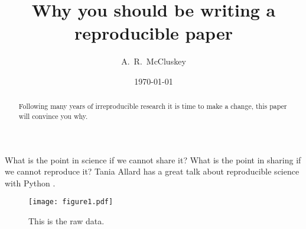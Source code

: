 \documentclass[amsmath,amssymb,twocolumn,superscriptaddress,aps,prl]{revtex4-1}
\begin{document}
\title{Why you should be writing a reproducible paper}

\author{A.~R.~McCluskey}

\date{\today}

\begin{abstract}
  Following many years of irreproducible research it is time to make a change, this paper will convince you why.
\end{abstract}

\maketitle

What is the point in science if we cannot share it?
What is the point in sharing if we cannot reproduce it?
Tania Allard has a great talk about reproducible science with Python \cite{Allard2018}.

\begin{figure}
  \centering
  \texttt{[image: figure1.pdf]}
  \caption{\small This is the raw data.}
  \label{fig:raw}
\end{figure}

\lipsum


\end{document}

